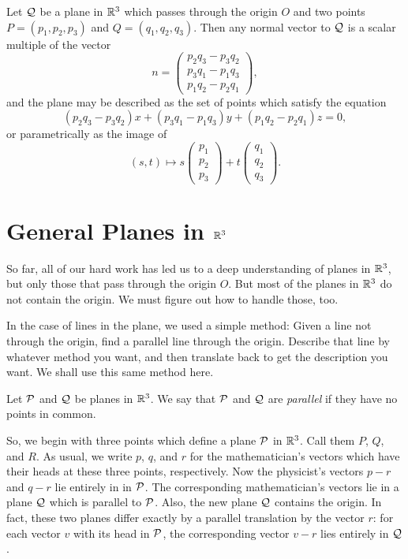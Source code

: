 \documentclass[00-livre-main.tex]{subfiles}
\begin{document}
\begin{theorem}\label{thm:plane-2-points}
Let $\mathcal{Q}$ be a plane in $\mathbb{R}^3$ which passes through the origin $O$ and two points $P = (p_1,p_2,p_3)$ and $Q=(q_1,q_2,q_3)$. Then any normal vector to $\mathcal{Q}$ is a scalar multiple of the vector
\[
n = \begin{pmatrix} p_2 q_3 - p_3 q_2 \\
p_3 q_1 - p_1 q_3 \\ p_1 q_2 - p_2 q_1 \end{pmatrix},
\]
and the plane may be described as the set of points which satisfy the equation
\[
(p_2 q_3 - p_3 q_2) x +
(p_3 q_1 - p_1 q_3) y +
(p_1 q_2 - p_2 q_1) z = 0,
\]
or parametrically as the image of 
\[
(s,t) \mapsto s \begin{pmatrix} p_1 \\ p_2 \\ p_3 \end{pmatrix} + t \begin{pmatrix} q_1 \\ q_2 \\ q_3 \end{pmatrix}.
\]
\end{theorem}

\section*{General Planes in $\mathbb{R}^3$}

So far, all of our hard work has led us to a deep understanding of planes in $\mathbb{R}^3$, but only those that pass through the origin $O$. But most of the planes in $\mathbb{R}^3$ do not contain the origin. We must figure out how to handle those, too.

In the case of lines in the plane, we used a simple method: Given a line not through the origin, find a parallel line through the origin. Describe that line by whatever method you want, and then translate back to get the description you want. We shall use this same method here. 

\begin{definition}
Let $\mathcal{P}$ and $\mathcal{Q}$ be planes in $\mathbb{R}^3$. We say that $\mathcal{P}$ and $\mathcal{Q}$ are \emph{parallel} if they have no points in common.
\end{definition}

So, we begin with three points which define a plane $\mathcal{P}$ in $\mathbb{R}^3$. Call them $P$, $Q$, and $R$. As usual, we write $p$, $q$, and $r$ for the mathematician's vectors which have their heads at these three points, respectively. Now the physicist's vectors $p-r$ and $q-r$ lie entirely in in $\mathcal{P}$. The corresponding mathematician's vectors lie in a plane $\mathcal{Q}$ which is parallel to $\mathcal{P}$. Also, the new plane $\mathcal{Q}$ contains the origin. In fact, these two planes differ exactly by a parallel translation by the vector $r$: for each vector $v$ with its head in $\mathcal{P}$, the corresponding vector $v-r$ lies entirely in $\mathcal{Q}$.
\end{document}
